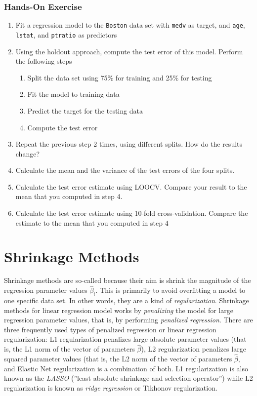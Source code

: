 \begin{tcolorbox}[colback=code]
\subsubsection*{Hands-On Exercise} 

\begin{enumerate}
  \item Fit a regression model to the \texttt{Boston} data set with \texttt{medv} as target, and \texttt{age}, \texttt{lstat}, and \texttt{ptratio} as predictors
  \item Using the holdout approach, compute the test error of this model. Perform the following steps
  \begin{enumerate}
     \item Split the data set using 75\% for training and 25\% for testing
     \item Fit the model to training data
     \item Predict the target for the testing data
     \item Compute the test error
  \end{enumerate}
  \item Repeat the previous step 2 times, using different splits. How do the results change?
  \item Calculate the mean and the variance of the test errors of the four splits. 
  \item Calculate the test error estimate using LOOCV. Compare your result to the mean that you computed in step 4.
  \item Calculate the test error estimate using 10-fold cross-validation. Compare the estimate to the mean that you computed in step 4
\end{enumerate}
\end{tcolorbox}

\section{Shrinkage Methods}

Shrinkage methods are so-called because their aim is shrink the magnitude of the regression parameter values $\hat{\beta}_i$. This is primarily to avoid overfitting a model to one specific data set. In other words, they are a kind of \emph{regularization}. Shrinkage methods for linear regression model works by \emph{penalizing} the model for large regression parameter values, that is, by performing \emph{penalized regression}. There are three frequently used types of penalized regression or linear regression regularization: L1 regularization penalizes large absolute parameter values (that is, the L1 norm of the vector of parameters $\hat{\beta}$), L2 regularization penalizes large squared parameter values (that is, the L2 norm of the vector of parameters $\hat{\beta}$, and Elastic Net regularization is a combination of both. L1 regularization is also known as the \emph{LASSO} (''least absolute shrinkage and selection operator'') while L2 regularization is known as \emph{ridge regression} or Tikhonov regularization. 

